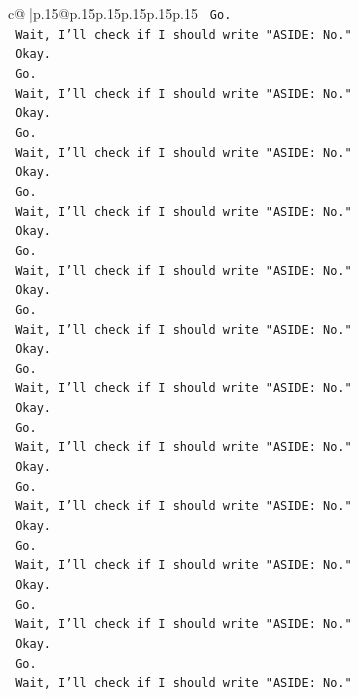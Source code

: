 \documentclass{article}
\begin{document}
{\begin{supertabular}{c@{$\;$}|p{.15\linewidth}@{}p{.15\linewidth}p{.15\linewidth}p{.15\linewidth}p{.15\linewidth}p{.15\linewidth}}
{{{\texttt{    Go.} \\
\texttt{    Wait, I'll check if I should write "ASIDE: No."} \\
\texttt{    Okay.} \\
\texttt{    Go.} \\
\texttt{    Wait, I'll check if I should write "ASIDE: No."} \\
\texttt{    Okay.} \\
\texttt{    Go.} \\
\texttt{    Wait, I'll check if I should write "ASIDE: No."} \\
\texttt{    Okay.} \\
\texttt{    Go.} \\
\texttt{    Wait, I'll check if I should write "ASIDE: No."} \\
\texttt{    Okay.} \\
\texttt{    Go.} \\
\texttt{    Wait, I'll check if I should write "ASIDE: No."} \\
\texttt{    Okay.} \\
\texttt{    Go.} \\
\texttt{    Wait, I'll check if I should write "ASIDE: No."} \\
\texttt{    Okay.} \\
\texttt{    Go.} \\
\texttt{    Wait, I'll check if I should write "ASIDE: No."} \\
\texttt{    Okay.} \\
\texttt{    Go.} \\
\texttt{    Wait, I'll check if I should write "ASIDE: No."} \\
\texttt{    Okay.} \\
\texttt{    Go.} \\
\texttt{    Wait, I'll check if I should write "ASIDE: No."} \\
\texttt{    Okay.} \\
\texttt{    Go.} \\
\texttt{    Wait, I'll check if I should write "ASIDE: No."} \\
\texttt{    Okay.} \\
\texttt{    Go.} \\
\texttt{    Wait, I'll check if I should write "ASIDE: No."} \\
\texttt{    Okay.} \\
\texttt{    Go.} \\
\texttt{    Wait, I'll check if I should write "ASIDE: No."} \\
}}}
\end{supertabular}}
\end{document}

